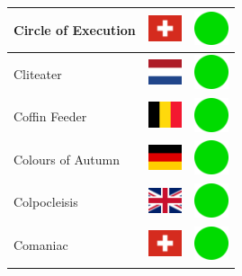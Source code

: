 \documentclass[12pt, a4paper, twoside]{report}
\begin{document}
\begin{center}
\begin{longtable}{|p{5cm}|p{2cm}|p{2cm}|}
Circle of Execution & \includegraphics[width=1cm]{4x3/ch} & \includegraphics[width=1cm]{likes/y} \\ \hline
Cliteater & \includegraphics[width=1cm]{4x3/nl} & \includegraphics[width=1cm]{likes/y} \\ \hline
Coffin Feeder & \includegraphics[width=1cm]{4x3/be} & \includegraphics[width=1cm]{likes/y} \\ \hline
Colours of Autumn & \includegraphics[width=1cm]{4x3/de} & \includegraphics[width=1cm]{likes/y} \\ \hline
Colpocleisis & \includegraphics[width=1cm]{4x3/gb} & \includegraphics[width=1cm]{likes/y} \\ \hline
Comaniac & \includegraphics[width=1cm]{4x3/ch} & \includegraphics[width=1cm]{likes/y} \\ \hline

\end{longtable}
\end{center}
\end{document}
